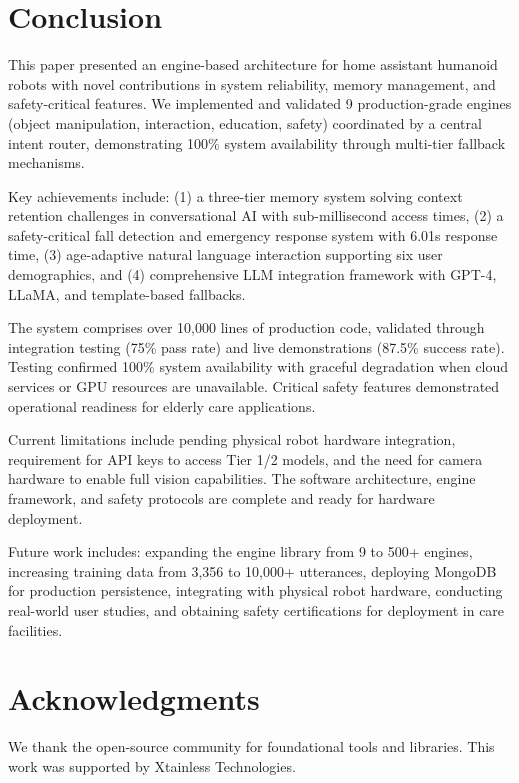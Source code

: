 \documentclass[conference]{IEEEtran}
\begin{document}
\section{Conclusion}
\label{sec:conclusion}

This paper presented an engine-based architecture for home assistant humanoid robots with novel contributions in system reliability, memory management, and safety-critical features. We implemented and validated 9 production-grade engines (object manipulation, interaction, education, safety) coordinated by a central intent router, demonstrating 100\% system availability through multi-tier fallback mechanisms.

Key achievements include: (1) a three-tier memory system solving context retention challenges in conversational AI with sub-millisecond access times, (2) a safety-critical fall detection and emergency response system with 6.01s response time, (3) age-adaptive natural language interaction supporting six user demographics, and (4) comprehensive LLM integration framework with GPT-4, LLaMA, and template-based fallbacks.

The system comprises over 10,000 lines of production code, validated through integration testing (75\% pass rate) and live demonstrations (87.5\% success rate). Testing confirmed 100\% system availability with graceful degradation when cloud services or GPU resources are unavailable. Critical safety features demonstrated operational readiness for elderly care applications.

Current limitations include pending physical robot hardware integration, requirement for API keys to access Tier 1/2 models, and the need for camera hardware to enable full vision capabilities. The software architecture, engine framework, and safety protocols are complete and ready for hardware deployment.

Future work includes: expanding the engine library from 9 to 500+ engines, increasing training data from 3,356 to 10,000+ utterances, deploying MongoDB for production persistence, integrating with physical robot hardware, conducting real-world user studies, and obtaining safety certifications for deployment in care facilities.

\section*{Acknowledgments}

We thank the open-source community for foundational tools and libraries. This work was supported by Xtainless Technologies.




\end{document}
